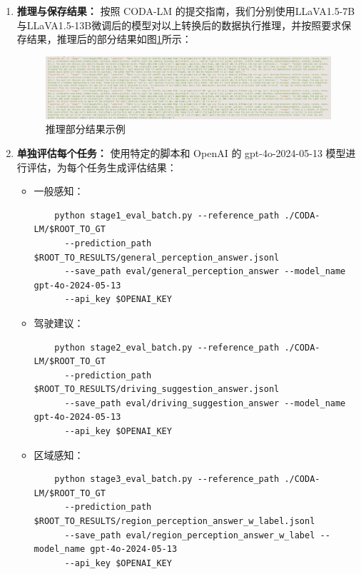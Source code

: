 \documentclass[
    linespread = 1.25
]{ctexart}
\begin{document}
\begin{enumerate}
  \item \textbf{推理与保存结果：}
        按照 CODA-LM 的提交指南，我们分别使用LLaVA1.5-7B与LLaVA1.5-13B微调后的模型对以上转换后的数据执行推理，并按照要求保存结果，推理后的部分结果如图\ref{fig:tuili}所示：
        \begin{figure}[h] %
          \centering %
          \includegraphics[width=1\textwidth]{tuili.jpg} %
          \caption{推理部分结果示例} %
          \label{fig:tuili} %
        \end{figure}

  \item \textbf{单独评估每个任务：}
        使用特定的脚本和 OpenAI 的 gpt-4o-2024-05-13 模型进行评估，为每个任务生成评估结果：
        \begin{itemize}
          \item 一般感知：
                \begin{verbatim}
    python stage1_eval_batch.py --reference_path ./CODA-LM/$ROOT_TO_GT
      --prediction_path $ROOT_TO_RESULTS/general_perception_answer.jsonl
      --save_path eval/general_perception_answer --model_name gpt-4o-2024-05-13
      --api_key $OPENAI_KEY
    \end{verbatim}
          \item 驾驶建议：
                \begin{verbatim}
    python stage2_eval_batch.py --reference_path ./CODA-LM/$ROOT_TO_GT
      --prediction_path $ROOT_TO_RESULTS/driving_suggestion_answer.jsonl
      --save_path eval/driving_suggestion_answer --model_name gpt-4o-2024-05-13
      --api_key $OPENAI_KEY
    \end{verbatim}
          \item 区域感知：
                \begin{verbatim}
    python stage3_eval_batch.py --reference_path ./CODA-LM/$ROOT_TO_GT
      --prediction_path $ROOT_TO_RESULTS/region_perception_answer_w_label.jsonl
      --save_path eval/region_perception_answer_w_label --model_name gpt-4o-2024-05-13
      --api_key $OPENAI_KEY
    \end{verbatim}
        \end{itemize}
\end{enumerate}
\end{document}
